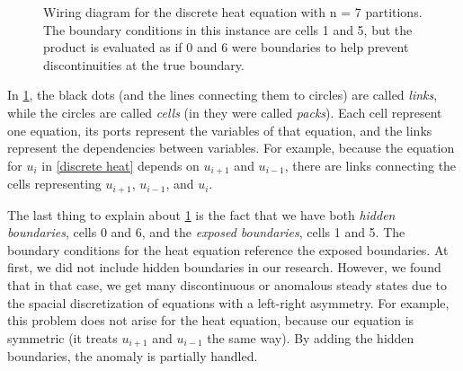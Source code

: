 \documentclass[11pt]{article}
\begin{document}
\begin{figure}
\caption{Wiring diagram for the discrete heat equation with n = 7 partitions. The boundary conditions in this instance are cells 1 and 5, but the product is evaluated as if 0 and 6 were boundaries to help prevent discontinuities at the true boundary.}
\label{WD_heat}
\begin{center}
\end{center}
\end{figure}

In \cref{WD_heat}, the black dots (and the lines connecting them to circles) are called \textit{links}, while the circles are called \textit{cells} (in \citep{Introduction_to_PA} they were called \textit{packs}). Each cell represent one equation, its ports represent the variables of that equation, and the links represent the dependencies between variables. For example, because the equation for $u_i$ in \cref{discrete heat} depends on $u_{i+1}$ and $u_{i-1}$, there are links connecting the cells representing $u_{i+1}$, $u_{i-1}$, and $u_i$.

The last thing to explain about \cref{WD_heat} is the fact that we have both \emph{hidden boundaries}, cells 0 and 6, and the \emph{exposed boundaries}, cells 1 and 5. The boundary conditions for the heat equation reference the exposed boundaries. At first, we did not include hidden boundaries in our research. However, we found that in that case, we get many discontinuous or anomalous steady states due to the spacial discretization of equations with a left-right asymmetry. For example, this problem does not arise for the heat equation, because our equation is symmetric (it treats $u_{i+1}$ and $u_{i-1}$ the same way). By adding the hidden boundaries, the anomaly is partially handled.
\end{document}
